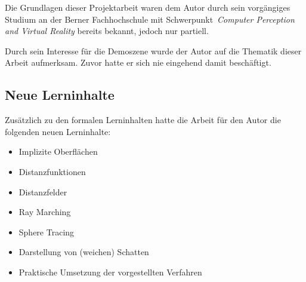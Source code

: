 Die Grundlagen dieser Projektarbeit waren dem Autor durch sein
vorgängiges Studium an der Berner Fachhochschule mit
Schwerpunkt~\textit{Computer Perception and Virtual Reality} bereits
bekannt, jedoch nur partiell.

Durch sein Interesse für die Demoszene wurde der Autor auf die Thematik
dieser Arbeit aufmerksam. Zuvor hatte er sich nie eingehend damit
beschäftigt.

\subsection{Neue Lerninhalte}
\label{subsec:new_learning_contents}

Zusätzlich zu den formalen Lerninhalten hatte die Arbeit für den Autor
die folgenden neuen Lerninhalte:
\begin{itemize}
    \item{Implizite Oberflächen}
    \item{Distanzfunktionen}
    \item{Distanzfelder}
    \item{Ray Marching}
    \item{Sphere Tracing}
    \item{Darstellung von (weichen) Schatten}
    \item{Praktische Umsetzung der vorgestellten Verfahren}
\end{itemize}
